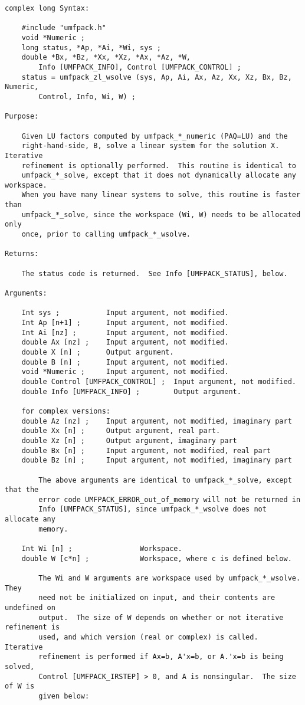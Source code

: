 {\begin{verbatim}
complex long Syntax:

    #include "umfpack.h"
    void *Numeric ;
    long status, *Ap, *Ai, *Wi, sys ;
    double *Bx, *Bz, *Xx, *Xz, *Ax, *Az, *W,
        Info [UMFPACK_INFO], Control [UMFPACK_CONTROL] ;
    status = umfpack_zl_wsolve (sys, Ap, Ai, Ax, Az, Xx, Xz, Bx, Bz, Numeric,
        Control, Info, Wi, W) ;

Purpose:

    Given LU factors computed by umfpack_*_numeric (PAQ=LU) and the
    right-hand-side, B, solve a linear system for the solution X.  Iterative
    refinement is optionally performed.  This routine is identical to
    umfpack_*_solve, except that it does not dynamically allocate any workspace.
    When you have many linear systems to solve, this routine is faster than
    umfpack_*_solve, since the workspace (Wi, W) needs to be allocated only
    once, prior to calling umfpack_*_wsolve.

Returns:

    The status code is returned.  See Info [UMFPACK_STATUS], below.

Arguments:

    Int sys ;           Input argument, not modified.
    Int Ap [n+1] ;      Input argument, not modified.
    Int Ai [nz] ;       Input argument, not modified.
    double Ax [nz] ;    Input argument, not modified.
    double X [n] ;      Output argument.
    double B [n] ;      Input argument, not modified.
    void *Numeric ;     Input argument, not modified.
    double Control [UMFPACK_CONTROL] ;  Input argument, not modified.
    double Info [UMFPACK_INFO] ;        Output argument.

    for complex versions:
    double Az [nz] ;    Input argument, not modified, imaginary part
    double Xx [n] ;     Output argument, real part.
    double Xz [n] ;     Output argument, imaginary part
    double Bx [n] ;     Input argument, not modified, real part
    double Bz [n] ;     Input argument, not modified, imaginary part

        The above arguments are identical to umfpack_*_solve, except that the
        error code UMFPACK_ERROR_out_of_memory will not be returned in
        Info [UMFPACK_STATUS], since umfpack_*_wsolve does not allocate any
        memory.

    Int Wi [n] ;                Workspace.
    double W [c*n] ;            Workspace, where c is defined below.

        The Wi and W arguments are workspace used by umfpack_*_wsolve.  They
        need not be initialized on input, and their contents are undefined on
        output.  The size of W depends on whether or not iterative refinement is
        used, and which version (real or complex) is called.  Iterative
        refinement is performed if Ax=b, A'x=b, or A.'x=b is being solved,
        Control [UMFPACK_IRSTEP] > 0, and A is nonsingular.  The size of W is
        given below:


\end{verbatim}}
